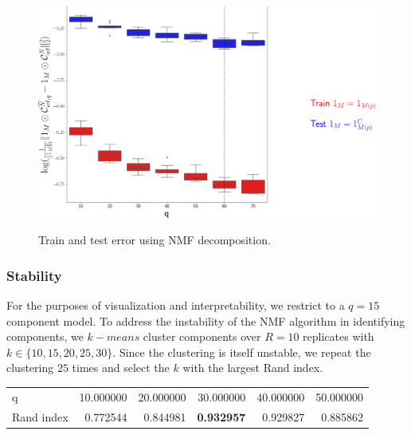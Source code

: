 \begin{figure}[H]
    \centering
    \includegraphics[width = 5in]{figs/nmf_test_train.png} 
    \label{fig:train_test}
    \caption{Train and test error using NMF decomposition.}
\end{figure}

\newpage

\subsubsection{Stability}

For the purposes of visualization and interpretability, we restrict to a $q = 15$ component model.
To address the instability of the NMF algorithm in identifying components, we $k-means$ cluster components over $R = 10$ replicates with $k \in \{10,15,20, 25, 30\}$.
Since the clustering is itself unstable, we repeat the clustering $25$ times and select the $k$ with the largest Rand index.

\begin{tabular}{lrrrrr}
\toprule
q          &  10.000000 &  20.000000 &  30.000000 &  40.000000 &  50.000000 \\
Rand index &   0.772544 &   0.844981 &   \textbf{0.932957} &   0.929827 &   0.885862 \\
\bottomrule
\end{tabular}

